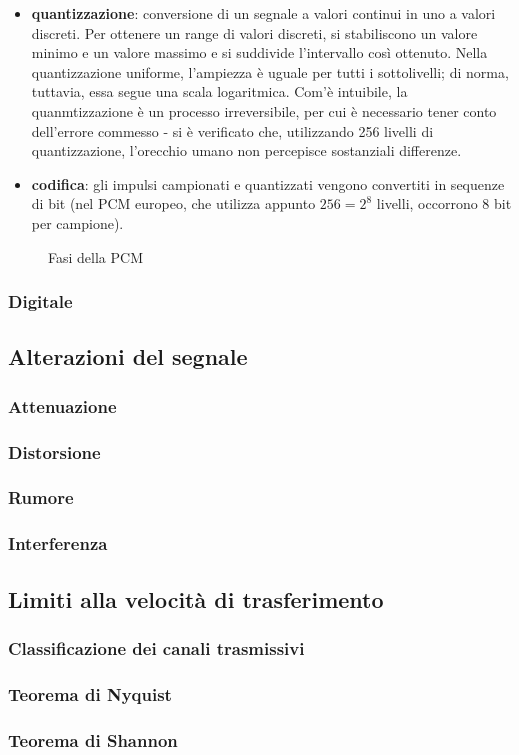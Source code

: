 \documentclass[a4paper,11pt]{article}
\def\sub#1{\subsection{#1}\label{#1}}
\def\subsub#1{\subsubsection{#1}\label{#1}}
\begin{document}
\begin{itemize}
\begin{itemize}
\item \textbf{quantizzazione}: conversione di un segnale a valori continui in uno a valori discreti. Per ottenere un range di valori discreti, si stabiliscono un valore minimo e un valore massimo e si suddivide l'intervallo così ottenuto. Nella quantizzazione uniforme, l'ampiezza è uguale per tutti i sottolivelli; di norma, tuttavia, essa segue una scala logaritmica. Com'è intuibile, la quanmtizzazione è un processo irreversibile, per cui è necessario tener conto dell'errore commesso - si è verificato che, utilizzando 256 livelli di quantizzazione, l'orecchio umano non percepisce sostanziali differenze.
\item \textbf{codifica}: gli impulsi campionati e quantizzati vengono convertiti in sequenze di bit (nel PCM europeo, che utilizza appunto $256=2^{8}$ livelli, occorrono 8 bit per campione).
\end{itemize}
\begin{figure}[h]
\centering
{}
\caption{Fasi della PCM}
\label{fig. 4}
\end{figure}
\end{itemize}

\subsub{Digitale}

\sub{Alterazioni del segnale}
\subsub{Attenuazione}
\subsub{Distorsione}
\subsub{Rumore}
\subsub{Interferenza}

\subsection{Limiti alla velocità di trasferimento}
\subsub{Classificazione dei canali trasmissivi}
\subsub{Teorema di Nyquist}
\subsub{Teorema di Shannon}
\end{document}
